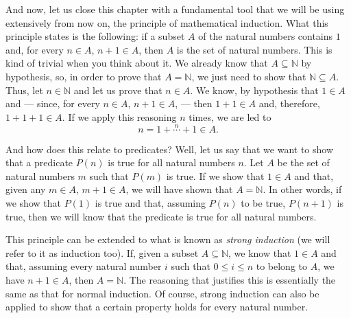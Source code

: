 \begin{para}
And now, let us close this chapter with a fundamental tool that we will be using extensively from now on, the principle of mathematical induction.
What this principle states is the following: if a subset $A$ of the natural numbers contains $1$ and, for every $n \in A$, $n+1 \in A$, then $A$ is the set of natural numbers.
This is kind of trivial when you think about it.
We already know that $A \subseteq \mathbb{N}$ by hypothesis, so, in order to prove that $A = \mathbb{N}$, we just need to show that $\mathbb{N} \subseteq A$.
Thus, let $n\in\mathbb{N}$ and let us prove that $n\in A$.
We know, by hypothesis that $1 \in A$ and --- since, for every $n\in A$, $n+1\in A$, --- then $1 + 1 \in A$ and, therefore, $1 + 1 + 1 \in A$. If we apply this reasoning $n$ times, we are led to
\[ n = 1 + \overset{n}{\cdots} + 1 \in A.\]

And how does this relate to predicates?
Well, let us say that we want to show that a predicate $P(n)$ is true for all natural numbers $n$.
Let $A$ be the set of natural numbers $m$ such that $P(m)$ is true.
If we show that $1 \in A$ and that, given any $m\in A$, $m+1 \in A$, we will have shown that $A = \mathbb{N}$.
In other words, if we show that $P(1)$ is true and that, assuming $P(n)$ to be true, $P(n+1)$ is true, then we will know that the predicate is true for all natural numbers.

This principle can be extended to what is known as \emph{strong induction} (we will refer to it as induction too).
If, given a subset $A\subseteq \mathbb{N}$, we know that $1\in A$ and that, assuming every natural number $i$ such that $0\leq i \leq n$ to belong to $A$, we have $n+1 \in A$, then $A = \mathbb{N}$.
The reasoning that justifies this is essentially the same as that for normal induction.
Of course, strong induction can also be applied to show that a certain property holds for every natural number.
\end{para}
